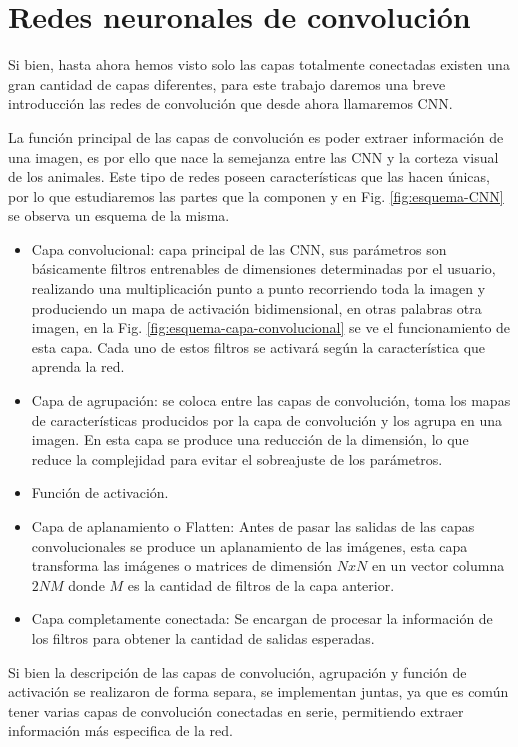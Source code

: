 \section{Redes neuronales de convolución}

Si bien, hasta ahora hemos visto solo las capas totalmente conectadas existen una gran cantidad de capas diferentes, para este trabajo daremos una breve introducción las redes de convolución que desde ahora llamaremos CNN.

La función principal de las capas de convolución es poder extraer información de una imagen, es por ello que nace la semejanza entre las CNN y la corteza visual de los animales.
Este tipo de redes poseen características que las hacen únicas, por lo que
estudiaremos las partes que la componen y en Fig. \ref{fig:esquema-CNN} se observa un esquema de la misma.
\begin{itemize}
    \item Capa convolucional: capa principal de las CNN, sus parámetros son básicamente filtros entrenables de dimensiones determinadas por el
          usuario, realizando una multiplicación punto a punto recorriendo toda la imagen y produciendo un mapa de activación bidimensional, en otras palabras otra imagen, en la
          Fig. \ref{fig:esquema-capa-convolucional} se ve el funcionamiento de esta capa. Cada uno de estos filtros se activará según la característica que aprenda la red.
    \item Capa de agrupación: se coloca entre las capas de convolución, toma los mapas de características producidos por la capa de
          convolución y los agrupa en una imagen. En esta capa se produce una reducción de la dimensión, lo que reduce la complejidad para evitar el sobreajuste de los parámetros.
    \item Función de activación.
    \item Capa de aplanamiento o Flatten: Antes de pasar las salidas de las capas convolucionales se produce un aplanamiento de las imágenes, esta capa transforma las imágenes o matrices de dimensión $NxN$ en un vector columna $2NM$ donde $M$ es la cantidad de filtros de la capa anterior.
    \item Capa completamente conectada: Se encargan de procesar la información de los filtros para obtener la cantidad de salidas esperadas.
\end{itemize}

Si bien la descripción de las capas de convolución, agrupación y función de activación se realizaron de forma separa, se implementan juntas, ya que es común tener varias capas de convolución conectadas en serie, permitiendo extraer información más especifica de la red.


